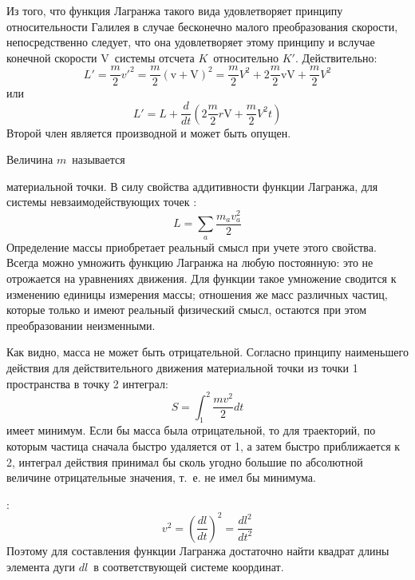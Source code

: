 Из того, что функция Лагранжа такого вида удовлетворяет принципу
относительности Галилея в случае бесконечно малого преобразования скорости,
непосредственно следует, что она удовлетворяет этому принципу и вслучае
конечной скорости $\mathrm{V}$\, системы отсчета $K$\, относительно $K'$.
Действительно:
$$
L'=\frac{m}{2}v'^2 = \frac{m}{2}(\mathrm{v} + \mathrm{V})^2 =
\frac{m}{2}V^2 + 2\frac{m}{2}\mathrm{v}\mathrm{V}
+ \frac{m}{2} V^2
$$
или
$$
L' = L + \frac{d}{dt}\left(2\frac{m}{2}r\mathrm{V} +\frac{m}{2}V^2t\right)
$$
Второй член является производной и может быть опущен.


Величина $m$\, называется
\parbox{41.7pt}{}
материальной точки. В силу свойства аддитивности функции Лагранжа,
для системы невзаимодействующих точек :
\begin{equation}\label{mech13}
L = \sum_a \frac{m_av^2_a}{2}
\end{equation}
Определение массы приобретает реальный смысл при учете этого свойства.
Всегда можно умножить функцию Лагранжа на любую постоянную: это не
отрожается на уравнениях движения. Для функции  такое умножение
сводится к изменению единицы измерения массы; отношения же масс различных
частиц, которые только и имеют реальный физический смысл, остаются при этом
преобразовании неизменными.

Как видно, масса не может быть отрицательной. Согласно принципу наименьшего
действия для действительного движения материальной точки из точки 1
пространства в точку 2  интеграл:
$$
S = \int^{2}_{1} \frac{mv^2}{2} dt
$$
имеет минимум. Если бы масса была отрицательной, то для траекторий, по
которым частица сначала быстро удаляется от 1, а затем быстро приближается
к 2, интеграл действия принимал бы сколь угодно большие по абсолютной
величине отрицательные значения, т.~е. не имел бы минимума.

:
\begin{equation}\label{mech14}
v^2 = \left(\frac{dl}{dt}\right)^2 = \frac{dl^2}{dt^2}
\end{equation}
Поэтому для составления функции Лагранжа достаточно найти квадрат длины
элемента дуги $dl$\, в соответствующей системе координат.\\

